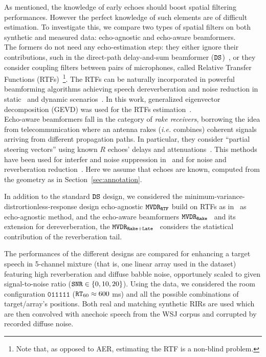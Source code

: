 As mentioned, the knowledge of early echoes should boost spatial filtering performances. However the perfect knowledge of such elements are of difficult estimation. To investigate this, we compare two types of spatial filters on both synthetic and measured data: echo-agnostic and echo-aware beamformers.
\\The formers do not need any echo-estimation step: they either ignore their contributions, such in the direct-path delay-and-sum beamformer ($\mathtt{DS}$)~, or they consider coupling filters between pairs of microphones, called Relative Transfer Functions (RTFs)~\footnote{Note that, as opposed to AER, estimating the RTF is a non-blind problem.}.
The RTFs can be naturally incorporated in powerful beamforming algorithms achieving speech dereverberation and noise reduction in static~
and dynamic scenarios~.
In this work, generalized eigenvector decomposition (GEVD) was used for the RTFs estimation~.
\\Echo-aware beamformers fall in the category of \textit{rake receivers}, borrowing the idea from telecommunication where an antenna rakes (\textit{i.e.} combines) coherent signals arriving from different propagation paths.
In particular, they consider ``partial steering vectors'' using known $R$ echoes' delays and attenuations~. This methods have been used for interfer and noise suppression in~ and for noise and reverberation reduction~. Here we assume that echoes are known, computed from the geometry as in Section~\ref{sec:annotation}.

In addition to the standard $\mathtt{DS}$ design, we considered the minimum-variance-distrortionless-response design
echo-agnostic $\mathtt{MVDR}_\mathtt{RTF}$ build on RTFs as in~ as echo-agnostic method, and the echo-aware beamformers $\mathtt{MVDR}_\mathtt{Rake}$~ and its extension for dereverberation, the $\mathtt{MVDR}_\mathtt{Rake+Late}$~ considers the statistical contribution of the reverberation tail.

The performances of the different designs are compared for enhancing a target speech in 5-channel mixture (that is, one linear array used in the dataset) featuring high reverberation and diffuse babble noise, opportunely scaled to given signal-to-noise  ratio ($\SNR \in \kbrace{0, 10, 20}$).
Using the \dEchorate{} data, we considered the room configuration $\mathtt{011111}$ ($\mathtt{RT}_{60} \approx 600 $ ms) and all the possible combinations of target/array's positions. Both real and matching synthetic RIRs are used which are then convolved with anechoic speech from the WSJ corpus and corrupted by recorded diffuse noise.

